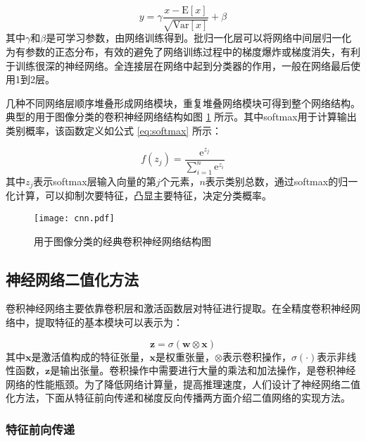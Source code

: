 \begin{equation}
  \label{eq:bn}
  y = \gamma \frac{x - \text{E}[x]}{\sqrt{\text{Var}[x]}} + \beta 
\end{equation}
其中$\gamma$和$\beta$是可学习参数，由网络训练得到。批归一化层可以将网络中间层归一化为有参数的正态分布，有效的避免了网络训练过程中的梯度爆炸或梯度消失，有利于训练很深的神经网络。全连接层在网络中起到分类器的作用，一般在网络最后使用1到2层。

几种不同网络层顺序堆叠形成网络模块，重复堆叠网络模块可得到整个网络结构。典型的用于图像分类的卷积神经网络结构如图 \ref{fig:cnn} 所示。其中softmax用于计算输出类别概率，该函数定义如公式 \eqref{eq:softmax} 所示：

\begin{equation}
  \label{eq:softmax}
  f(z_j) = \frac{\text{e}^{z_j}}{\sum_{i = 1}^{n} \text{e}^{z_i}} 
\end{equation}
其中$z_j$表示softmax层输入向量的第$j$个元素，$n$表示类别总数，通过softmax的归一化计算，可以抑制次要特征，凸显主要特征，决定分类概率。

\begin{figure}[htb]
  \vspace{6pt}
  \centering
  \texttt{[image: cnn.pdf]}
  \caption{用于图像分类的经典卷积神经网络结构图}
  \label{fig:cnn}
  \vspace{9pt}
\end{figure}

\subsection{神经网络二值化方法}

卷积神经网络主要依靠卷积层和激活函数层对特征进行提取。在全精度卷积神经网络中，提取特征的基本模块可以表示为：

\begin{equation}
  \bm{z} = \sigma (\bm{w} \otimes \bm{x})
\end{equation}
其中$\bm{x}$是激活值构成的特征张量，$\bm{x}$是权重张量，$\otimes$表示卷积操作，$\sigma(\cdot)$表示非线性函数，$\bm{z}$是输出张量。卷积操作中需要进行大量的乘法和加法操作，是卷积神经网络的性能瓶颈。为了降低网络计算量，提高推理速度，人们设计了神经网络二值化方法，下面从特征前向传递和梯度反向传播两方面介绍二值网络的实现方法。

\subsubsection{特征前向传递}


